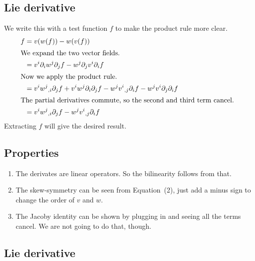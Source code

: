 \documentclass[11pt, english, fleqn, DIV=15, headinclude, BCOR=1cm]{scrartcl}
\begin{document}
\subsection{Lie derivative}

We write this with a test function $f$ to make the product rule more clear.
\begin{align*}
    [v, w]f
    &= v(w(f)) - w(v(f)) \\
    \intertext{%
        We expand the two vector fields.
    }
    &= v^i \partial_i w^j \partial_j f - w^j \partial_j v^i \partial_i f \\
    \intertext{%
        Now we apply the product rule.
    }
    &= v^i w^j{}_{,i} \partial_j f
    + v^i w^j \partial_i \partial_j f
    - w^j v^i{}_{,j} \partial_i f
    - w^j v^i \partial_j \partial_i f \\
    \intertext{%
        The partial derivatives commute, so the second and third term cancel.
    }
    &= v^i w^j{}_{,i} \partial_j f - w^j v^i{}_{,j} \partial_i f \\
\end{align*}
Extracting $f$ will give the desired result.

\subsection{Properties}

\begin{enumerate}
    \item
        The derivates are linear operators. So the bilinearity follows from
        that.

    \item
        The skew-symmetry can be seen from Equation~(2), just add a minus sign
        to change the order of $v$ and $w$.

    \item
        The Jacoby identity can be shown by plugging in and seeing all the
        terms cancel. We are not going to do that, though.
\end{enumerate}

\subsection{Lie derivative}
\end{document}
